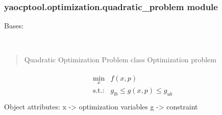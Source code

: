 \documentclass[letterpaper,10pt,english]{sphinxmanual}
\begin{document}
\subsubsection{yaocptool.optimization.quadratic\_problem module}
\label{\detokenize{yaocptool.optimization:module-yaocptool.optimization.quadratic_problem}}\label{\detokenize{yaocptool.optimization:yaocptool-optimization-quadratic-problem-module}}

\begin{fulllineitems}
\label{\detokenize{yaocptool.optimization:yaocptool.optimization.quadratic_problem.QuadraticOptimizationProblem}}
Bases: {\hyperref[\detokenize{yaocptool.optimization:yaocptool.optimization.abstract_optimization_problem.AbstractOptimizationProblem}]{}}

\begin{fulllineitems}
\label{\detokenize{yaocptool.optimization:yaocptool.optimization.quadratic_problem.QuadraticOptimizationProblem.__init__}}~\begin{quote}

Quadratic Optimization Problem class
Optimization problem
\end{quote}
\begin{align*}\!\begin{aligned}
\min_x &f(x, p)\\
\textrm{s.t.:} &g_{lb} \leq g(x,p) \leq g_{ub}\\
\end{aligned}\end{align*}
Object attributes:
x -\textgreater{} optimization variables
g -\textgreater{} constraint

\end{fulllineitems}


\end{fulllineitems}
\end{document}

